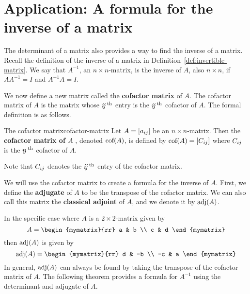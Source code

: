 \section{Application: A formula for the inverse of a matrix}

The determinant of a matrix also provides a way to find the inverse of
a matrix.  Recall the definition of the inverse of a matrix in
Definition~\ref{def:invertible-matrix}.  We say that $A^{-1}$, an
$n \times n$-matrix, is the inverse of $A$, also $n \times n$, if
$AA^{-1} = I$ and $A^{-1}A=I$.

We now define a new matrix called the \textbf{cofactor matrix} of $A$.
The cofactor matrix of $A$ is the matrix whose $\ijth$ entry is the
$\ijth$ cofactor of $A$.  The formal definition is as follows.

\begin{definition}{The cofactor matrix}{cofactor-matrix}
  Let $A=\mat{a_{ij}}$ be an $n\times n$-matrix. Then the
  \textbf{cofactor matrix of $A$}%
  , denoted $\func{cof}(A)$, is defined by
  $\func{cof}(A) =\mat{ \cof{A}{ij}} $ where $\cof{A}{ij}$ is the
  $\ijth$ cofactor of $A$.
\end{definition}

Note that $\cof{A}{ij}$ denotes the $\ijth$ entry of the cofactor
matrix.

We will use the cofactor matrix to create a formula for the inverse of
$A$. First, we define the \textbf{adjugate}%
 of $A$ to be the transpose of the cofactor matrix. We
can also call this matrix the \textbf{classical adjoint}%
 of $A$, and we denote it by
$\func{adj} (A)$.

In the specific case where $A$ is a $2 \times 2$-matrix given by
\begin{equation*}
  A = \begin{mymatrix}{rr}
    a & b \\
    c & d
  \end{mymatrix}
\end{equation*}
then $\func{adj}(A)$ is given by
\begin{equation*}
  \func{adj}(A) = 
  \begin{mymatrix}{rr}
    d & -b \\
    -c & a
  \end{mymatrix}
\end{equation*}
In general, $\func{adj}(A)$ can always be found by taking the
transpose of the cofactor matrix of $A$. The following theorem
provides a formula for $A^{-1}$ using the determinant and adjugate of
$A$.

